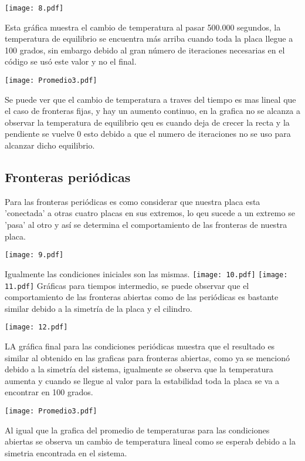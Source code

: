 \documentclass[a4paper,11pt]{article}
\begin{document}
\begin{center}
\texttt{[image: 8.pdf]}
\end{center}
Esta gr\'afica muestra el cambio de temperatura al pasar 500.000 segundos, la temperatura de equilibrio se encuentra m\'as arriba cuando toda la placa llegue a 100 grados, sin embargo debido al gran n\'umero de iteraciones necesarias en el c\'odigo se us\'o este valor y no el final.

\begin{center}
\texttt{[image: Promedio3.pdf]}
\end{center}
Se puede ver que el cambio de temperatura a traves del tiempo es mas lineal que el caso de fronteras fijas, y hay un aumento continuo, en la grafica no se alcanza a observar la temperatura de equilibrio qeu es cuando deja de crecer la recta y la pendiente se vuelve 0 esto debido a que el numero de iteraciones no se uso para alcanzar dicho equilibrio.

\subsection{Fronteras peri\'odicas}
Para las fronteras peri\'odicas es como considerar que nuestra placa esta 'conectada' a otras cuatro placas en sus extremos, lo qeu sucede a un extremo se 'pasa' al otro y as\'i se determina el comportamiento de las fronteras de nuestra placa.

\begin{center}
\texttt{[image: 9.pdf]}
\end{center}
Igualmente las condiciones iniciales son las mismas.
\texttt{[image: 10.pdf]}
\texttt{[image: 11.pdf]}
Gr\'aficas para tiempos intermedio, se puede observar que el comportamiento de las fronteras abiertas como de las peri\'odicas es bastante similar debido a la simetr\'ia de la placa y el cilindro.
\begin{center}
\texttt{[image: 12.pdf]}
\end{center}
LA gr\'afica final para las condiciones peri\'odicas muestra que el resultado es similar al obtenido en las graficas para fronteras abiertas, como ya se mencion\'o debido a la simetr\'ia del sistema, igualmente se observa que la temperatura aumenta y cuando se llegue al valor para la estabilidad toda la placa se va a encontrar en 100 grados.

\begin{center}
\texttt{[image: Promedio3.pdf]}
\end{center}
Al igual que la grafica del promedio de temperaturas para las condiciones abiertas se observa un cambio de temperatura lineal como se esperab debido a la simetria encontrada en el sistema.
\end{document}
